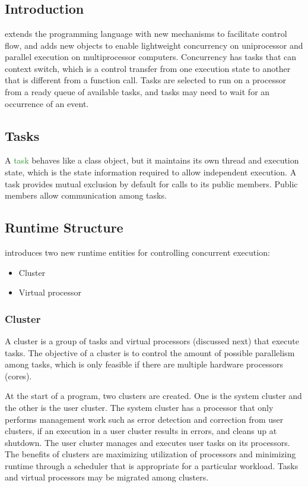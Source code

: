 \chapter{\uCPP} \label{uCPP}

\section{Introduction}
\uCPPS \cite{Reference10} extends the \CCS programming language with new
mechanisms to
facilitate control flow, and adds new objects to enable lightweight concurrency
on uniprocessor and parallel execution on multiprocessor computers. Concurrency has tasks
that can context switch, which is a control transfer from one execution state to
another that is different from a function call. Tasks are selected to run on a
processor from a ready queue of available tasks, and tasks may need to wait for an occurrence of an event.

\section{Tasks}
A \textcolor{ForestGreen}{task} behaves like a class object, but it maintains its own
thread and execution state, which is the state information required to allow
independent execution. A task provides mutual exclusion by default for calls to its
public members. Public members allow communication among tasks.

\section{\uCPPS Runtime Structure}
\uCPPS introduces two new runtime entities for controlling concurrent execution:
\begin{itemize}
    \item Cluster
    \item Virtual processor
\end{itemize}

\subsection{Cluster}
A cluster is a group of tasks and virtual processors (discussed next) that
execute tasks. The objective of a cluster is to control the amount of possible
parallelism among tasks, which is only feasible if there are multiple
hardware processors (cores).

At the start of a \uCPPS program, two clusters are created. One is the system
cluster and the other is the user cluster. The system cluster has a processor
that only performs management work such as error detection and correction from
user clusters, if an execution in a user cluster results in errors, and cleans
up at shutdown. The user cluster manages and executes user tasks on its
processors. The benefits of clusters are maximizing utilization of processors
and minimizing runtime through a scheduler that is appropriate for a particular
workload. Tasks and virtual processors may be migrated among clusters.


